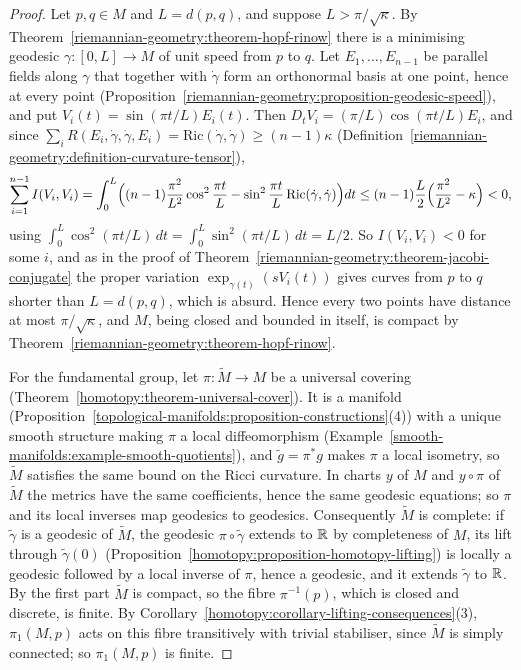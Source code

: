 \begin{proof}
Let $p, q \in M$ and $L = d(p, q)$, and suppose $L > \pi/\sqrt\kappa$. By Theorem~\ref{riemannian-geometry:theorem-hopf-rinow} there is a minimising geodesic
$\gamma \colon [0, L] \to M$ of unit speed from $p$ to $q$. Let $E_1, \ldots, E_{n-1}$ be parallel fields along $\gamma$ that together with $\dot\gamma$ form an orthonormal basis
at one point, hence at every point (Proposition~\ref{riemannian-geometry:proposition-geodesic-speed}), and put $V_i(t) = \sin(\pi t/L)E_i(t)$. Then $D_tV_i = (\pi/L)\cos(\pi t/L)E_i$,
and since $\sum_iR(E_i, \dot\gamma, \dot\gamma, E_i) = \mathrm{Ric}(\dot\gamma, \dot\gamma) \geq (n - 1)\kappa$ (Definition~\ref{riemannian-geometry:definition-curvature-tensor}),
\[
\sum_{i=1}^{n-1}I(V_i, V_i) = \int_0^L\Bigl((n - 1)\frac{\pi^2}{L^2}\cos^2\frac{\pi t}{L} - \sin^2\frac{\pi t}{L}\,\mathrm{Ric}(\dot\gamma, \dot\gamma)\Bigr)dt
\leq (n - 1)\frac L2\Bigl(\frac{\pi^2}{L^2} - \kappa\Bigr) < 0,
\]
using $\int_0^L\cos^2(\pi t/L)\,dt = \int_0^L\sin^2(\pi t/L)\,dt = L/2$. So $I(V_i, V_i) < 0$ for some $i$, and as in the proof of
Theorem~\ref{riemannian-geometry:theorem-jacobi-conjugate} the proper variation $\exp_{\gamma(t)}(sV_i(t))$ gives curves from $p$ to $q$ shorter than $L = d(p, q)$, which is
absurd. Hence every two points have distance at most $\pi/\sqrt\kappa$, and $M$, being closed and bounded in itself, is compact by
Theorem~\ref{riemannian-geometry:theorem-hopf-rinow}.

For the fundamental group, let $\pi \colon \widetilde{M} \to M$ be a universal covering (Theorem~\ref{homotopy:theorem-universal-cover}). It is a manifold
(Proposition~\ref{topological-manifolds:proposition-constructions}(4)) with a unique smooth structure making $\pi$ a local diffeomorphism
(Example~\ref{smooth-manifolds:example-smooth-quotients}), and $\tilde g = \pi^*g$ makes $\pi$ a local isometry, so $\widetilde{M}$ satisfies the same bound on the Ricci
curvature. In charts $y$ of $M$ and $y \circ \pi$ of $\widetilde{M}$ the metrics have the same coefficients, hence the same geodesic equations; so $\pi$ and its local inverses
map geodesics to geodesics. Consequently $\widetilde{M}$ is complete: if $\tilde\gamma$ is a geodesic of $\widetilde{M}$, the geodesic $\pi \circ \tilde\gamma$ extends to $\mathbb{R}$
by completeness of $M$, its lift through $\tilde\gamma(0)$ (Proposition~\ref{homotopy:proposition-homotopy-lifting}) is locally a geodesic followed by a local inverse of $\pi$,
hence a geodesic, and it extends $\tilde\gamma$ to $\mathbb{R}$. By the first part $\widetilde{M}$ is compact, so the fibre $\pi^{-1}(p)$, which is closed and discrete, is finite. By
Corollary~\ref{homotopy:corollary-lifting-consequences}(3), $\pi_1(M, p)$ acts on this fibre transitively with trivial stabiliser, since $\widetilde{M}$ is simply connected;
so $\pi_1(M, p)$ is finite.
\end{proof}

